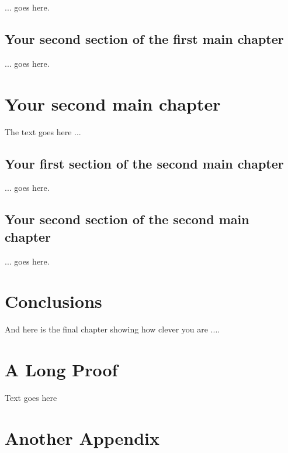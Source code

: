 \documentclass[12pt, a4paper,oneside]{book}
\numberwithin{equation}{section}
\begin{document}
... goes here.

\section{Your second section of the first main chapter}\label{sec:2.2}

... goes here.

\chapter{Your second main chapter}\label{ch:3}

The text goes here ... 

\section{Your first section of the second main chapter}\label{sec:3.1}

... goes here.

\section{Your second section of the second main chapter}\label{sec:3.2}

... goes here.

\chapter{Conclusions}\label{ch:concl}
And here is the final chapter showing how clever you are ....




\appendix
\chapter{A Long Proof}

Text goes here


\chapter{Another Appendix}
\end{document}
